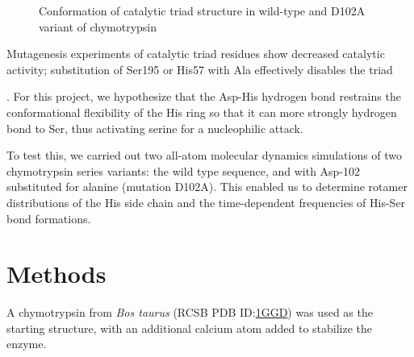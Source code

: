 \documentclass[12pt, twocolumn]{article}
\newcommand*{\nolink}[1]{%
\begin{NoHyper}#1\end{NoHyper}%
}
\begin{document}
\begin{figure}[H]

    \caption{Conformation of catalytic triad structure in wild-type and D102A variant of chymotrypsin}
\end{figure}

Mutagenesis experiments of catalytic
triad residues show decreased catalytic activity; substitution of Ser195 or His57 with Ala
effectively disables the triad~\nolink{\cite{hedstrom02}}. For this project, we hypothesize that
the Asp-His hydrogen bond restrains the conformational flexibility of the His ring so that
it can more strongly hydrogen bond to Ser, thus activating serine for a nucleophilic attack.

To test this, we carried out two all-atom molecular dynamics simulations of two
chymotrypsin series variants: the wild type sequence, and with Asp-102 substituted for
alanine (mutation D102A). This enabled us to determine rotamer distributions of the
His side chain and the time-dependent frequencies of His-Ser bond formations.

\section{Methods}

A chymotrypsin from \textit{Bos taurus} (RCSB PDB ID:\@ \href{http://www.rcsb.org/pdb/explore.do?structureId=1ggd}{1GGD}) was used as the starting
structure, with an additional calcium atom added to stabilize the enzyme.
\end{document}
